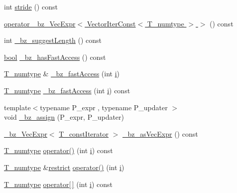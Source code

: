 \begin{DoxyCompactItemize}
\item 
int \hyperlink{classVector_a941b5a6e377ba6a0c127955d8a555ef5}{stride} () const 
\item 
\hyperlink{classVector_a47837d106251d81517d3877ae17f9f27}{operator \+\_\+bz\+\_\+\+Vec\+Expr$<$ Vector\+Iter\+Const$<$ T\+\_\+numtype $>$ $>$} () const 
\item 
int \hyperlink{classVector_a40d48e3950aac1d020b13c096cc19930}{\+\_\+bz\+\_\+suggest\+Length} () const 
\item 
\hyperlink{compiler_8h_abb452686968e48b67397da5f97445f5b}{bool} \hyperlink{classVector_a8d7a8c1338ec4c6d80c056c8a96e3e88}{\+\_\+bz\+\_\+has\+Fast\+Access} () const 
\item 
\hyperlink{classVector_a63dfe9fb06d8b4595b9e8fb10fc0755e}{T\+\_\+numtype} \& \hyperlink{classVector_ae76ca783ba8c09238851464dd858a522}{\+\_\+bz\+\_\+fast\+Access} (int \hyperlink{indexexpr_8h_aabd77643995707c185e95c8cb2782c81}{i})
\item 
\hyperlink{classVector_a63dfe9fb06d8b4595b9e8fb10fc0755e}{T\+\_\+numtype} \hyperlink{classVector_a5d3a05bca37f8a8f68ba1a4dffafdc5a}{\+\_\+bz\+\_\+fast\+Access} (int \hyperlink{indexexpr_8h_aabd77643995707c185e95c8cb2782c81}{i}) const 
\item 
{\footnotesize template$<$typename P\+\_\+expr , typename P\+\_\+updater $>$ }\\void \hyperlink{classVector_adafc51cfdf8ce77bb7b5f834f2e20ee9}{\+\_\+bz\+\_\+assign} (P\+\_\+expr, P\+\_\+updater)
\item 
\hyperlink{class__bz__VecExpr}{\+\_\+bz\+\_\+\+Vec\+Expr}$<$ \hyperlink{classVector_a6713f9dd10d7bd7d91b7452cf0208565}{T\+\_\+const\+Iterator} $>$ \hyperlink{classVector_a1ac2b769312c96ee1395530728445a5b}{\+\_\+bz\+\_\+as\+Vec\+Expr} () const 
\item 
\hyperlink{classVector_a63dfe9fb06d8b4595b9e8fb10fc0755e}{T\+\_\+numtype} \hyperlink{classVector_a30ba25e8c925e844db5b108045dcf1c9}{operator()} (int \hyperlink{indexexpr_8h_aabd77643995707c185e95c8cb2782c81}{i}) const 
\item 
\hyperlink{classVector_a63dfe9fb06d8b4595b9e8fb10fc0755e}{T\+\_\+numtype} \&\hyperlink{compiler_8h_a080abdcb9c02438f1cd2bb707af25af8}{restrict} \hyperlink{classVector_a15e0ad9ff7f44fcd4ea01ed3ad6be866}{operator()} (int \hyperlink{indexexpr_8h_aabd77643995707c185e95c8cb2782c81}{i})
\item 
\hyperlink{classVector_a63dfe9fb06d8b4595b9e8fb10fc0755e}{T\+\_\+numtype} \hyperlink{classVector_a3041dfa1ad0b03a054da1f652bf1e0bd}{operator\mbox{[}$\,$\mbox{]}} (int \hyperlink{indexexpr_8h_aabd77643995707c185e95c8cb2782c81}{i}) const 

\end{DoxyCompactItemize}
